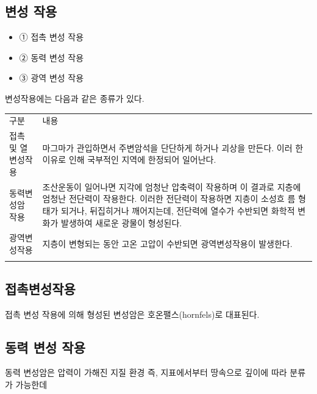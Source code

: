\documentclass[12pt, a4paper, twoside]{book}
\begin{document}
		\subsection{변성 작용}



			\begin{itemize}[topsep=0.0em, parsep=0.0em, itemsep=0em, leftmargin=12.0em, labelwidth=3em, labelsep=3em] 
			\item ① 접촉 변성 작용
			\item ② 동력 변성 작용
			\item ③ 광역 변성 작용
			\end{itemize}

			변성작용에는 다음과 같은 종류가 있다.  \tab

				\begin{tabu} to 1.0\textwidth { X[l, 1.0] X[l, 3.0] }
				\tabucline[0.2ex]{-}		
				구분	&내용\\
				\tabucline[0.1ex]{-}		
				접촉 및 열변성작용	&
				마그마가 관입하면서 주변암석을 단단하게 하거나 괴상을 만든다. 이러   한 이유로 인해 국부적인 지역에 한정되어 일어난다. \\
				동력변성암 작용 &
				조산운동이 일어나면 지각에 엄청난 압축력이 작용하며 이 결과로 지층에 엄청난 전단력이 작용한다. 
				이러한 전단력이 작용하면 지층이 소성흐   름 형태가 되거나, 뒤집히거나 깨어지는데, 전단력에 열수가 수반되면 화학적 변화가 발생하여 새로운 광물이 형성된다. \\
				광역변성작용 &
				지층이 변형되는 동안 고온 고압이 수반되면 광역변성작용이 발생한다. \\
				\tabucline[0.1ex]{-}		
				\end{tabu} 





		\subsection{접촉변성작용}

				접촉 변성 작용에 의해 형성된 변성암은 호온팰스(hornfels)로 대표된다.




		\subsection{동력 변성 작용}

				동력 변성암은
				압력이 가해진 지질 환경
				즉, 지표에서부터 땅속으로 깊이에 따라 분류가 가능한데
				
\end{document}
